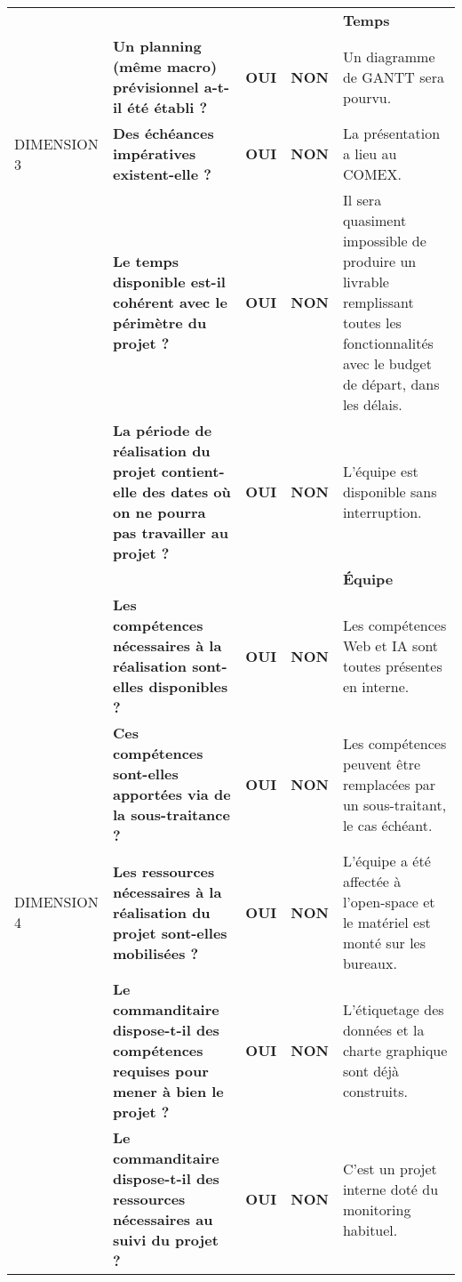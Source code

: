 \documentclass[12pt]{article}
\begin{document}
\begin{landscape}
\begin{table}[H]
{\begin{tabular}{p{2cm}p{}p{1cm}p{1cm}p{12.25cm}}
\hline \cellcolor{orange!75}& \cellcolor{orange!75}& \cellcolor{orange!75}& \cellcolor{orange!75}&\bf Temps \cellcolor{orange!75}\\
\cellcolor{orange!75} & \bf Un planning (même macro) prévisionnel a-t-il été établi ? & \bf OUI \cellcolor{green!50}& \bf NON\cellcolor{red!50} & Un diagramme de GANTT sera pourvu. \\
DIMENSION 3\cellcolor{orange!75} & \bf Des échéances impératives existent-elle ? & \bf OUI \cellcolor{green!50}& \bf NON\cellcolor{red!50} & La présentation a lieu au COMEX. \\
\cellcolor{orange!75} & \bf Le temps disponible est-il cohérent avec le périmètre du projet ? & \bf OUI \cellcolor{red!50}& \bf NON\cellcolor{green!50} & Il sera quasiment impossible de produire un livrable remplissant toutes les fonctionnalités avec le budget de départ, dans les délais. \\
\cellcolor{orange!75} & \bf La période de réalisation du projet contient-elle des dates où on ne pourra pas travailler au projet ? & \bf OUI \cellcolor{red!50}& \bf NON\cellcolor{green!50} & L’équipe est disponible sans interruption. \\
\hline \cellcolor{yellow!50}& \cellcolor{yellow!50}& \cellcolor{yellow!50}& \cellcolor{yellow!50}&\bf Équipe \cellcolor{yellow!50}\\
\cellcolor{yellow!50} & \bf Les compétences nécessaires à la réalisation sont-elles disponibles ? & \bf OUI \cellcolor{green!50}& \bf NON\cellcolor{red!50} & Les compétences Web et IA sont toutes présentes en interne. \\
\cellcolor{yellow!50} & \bf Ces compétences sont-elles apportées via de la sous-traitance ? & \bf OUI \cellcolor{red!50}& \bf NON\cellcolor{green!50} & Les compétences peuvent être remplacées par un sous-traitant, le cas échéant. \\
DIMENSION 4\cellcolor{yellow!50} & \bf Les ressources nécessaires à la réalisation du projet sont-elles mobilisées ? & \bf OUI \cellcolor{green!50}& \bf NON\cellcolor{red!50} & L’équipe a été affectée à l’open-space et le matériel est monté sur les bureaux. \\
\cellcolor{yellow!50} & \bf Le commanditaire dispose-t-il des compétences requises pour mener à bien le projet ? & \bf OUI \cellcolor{green!50}& \bf NON\cellcolor{red!50} & L’étiquetage des données et la charte graphique sont déjà construits. \\
\cellcolor{yellow!50} & \bf Le commanditaire dispose-t-il des ressources nécessaires au suivi du projet ? & \bf OUI \cellcolor{green!50}& \bf NON\cellcolor{red!50} & C’est un projet interne doté du monitoring habituel. \\

\end{tabular}}
\end{table}
\end{landscape}
\end{document}
